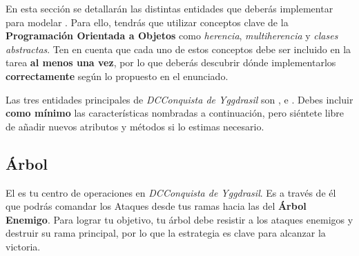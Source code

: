 \label{sec:entidades}

En esta sección se detallarán las distintas entidades que deberás implementar para modelar \programa. Para ello, tendrás que utilizar conceptos clave de la \textbf{Programación Orientada a Objetos} como \textit{herencia}, \textit{multiherencia} y \textit{clases abstractas}. Ten en cuenta que cada uno de estos conceptos debe ser incluido en la tarea \textbf{al menos una vez}, por lo que deberás descubrir dónde implementarlos \textbf{correctamente} según lo propuesto en el enunciado.

Las tres entidades principales de \textit{DCConquista de Yggdrasil} son ,  e . Debes incluir \textbf{como mínimo} las características nombradas a continuación, pero siéntete libre de añadir nuevos atributos y métodos si lo estimas necesario.

\subsection{Árbol} \label{subsec:Árbol}
El  es tu centro de operaciones en \textit{DCConquista de Yggdrasil}. Es a través de él que podrás comandar los Ataques desde tus ramas hacia las del \textbf{Árbol Enemigo}. Para lograr tu objetivo, tu árbol debe resistir a los ataques enemigos y destruir su rama principal, por lo que la estrategia es clave para alcanzar la victoria.

